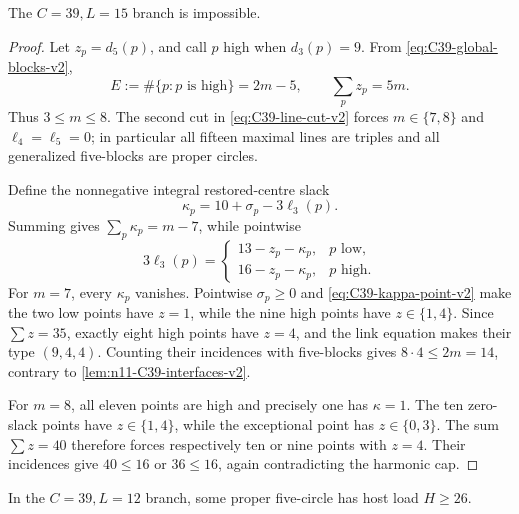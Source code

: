 \begin{lemma}[The \(L=15\) harmonic collapse]
\label{lem:n11-C39-L15-v2}
The \(C=39,L=15\) branch is impossible.
\end{lemma}

\begin{proof}
Let \(z_p=d_5(p)\), and call \(p\) high when \(d_3(p)=9\).  From
\eqref{eq:C39-global-blocks-v2},
\[
 E:=\#\{p:p\text{ is high}\}=2m-5,
 \qquad \sum_pz_p=5m.
\]
Thus \(3\le m\le8\).  The second cut in
\eqref{eq:C39-line-cut-v2} forces \(m\in\{7,8\}\) and
\(\ell_4=\ell_5=0\); in particular all fifteen maximal lines are triples
and all generalized five-blocks are proper circles.

Define the nonnegative integral restored-centre slack
\[
 \kappa_p=10+\sigma_p-3\ell_3(p).
\]
Summing gives \(\sum_p\kappa_p=m-7\), while pointwise
\begin{equation}\label{eq:C39-kappa-point-v2}
 3\ell_3(p)=
 \begin{cases}
 13-z_p-\kappa_p,&p\text{ low},\\
 16-z_p-\kappa_p,&p\text{ high}.
 \end{cases}
\end{equation}
For \(m=7\), every \(\kappa_p\) vanishes.  Pointwise
\(\sigma_p\ge0\) and \eqref{eq:C39-kappa-point-v2} make the two low points
have \(z=1\), while
the nine high points have \(z\in\{1,4\}\).  Since \(\sum z=35\), exactly
eight high points have \(z=4\), and the link equation makes their type
\((9,4,4)\).  Counting their incidences with five-blocks gives
\(8\cdot4\le2m=14\), contrary to
\cref{lem:n11-C39-interfaces-v2}.

For \(m=8\), all eleven points are high and precisely one has
\(\kappa=1\).  The ten zero-slack points have \(z\in\{1,4\}\), while the
exceptional point has \(z\in\{0,3\}\).  The sum \(\sum z=40\) therefore
forces respectively ten or nine points with \(z=4\).  Their incidences give
\(40\le16\) or \(36\le16\), again contradicting the harmonic cap.
\end{proof}

\begin{lemma}[The \(L=12\) low-host moment]
\label{lem:n11-C39-low-L12-v2}
In the \(C=39,L=12\) branch, some proper five-circle has host load
\(H\ge26\).
\end{lemma}

